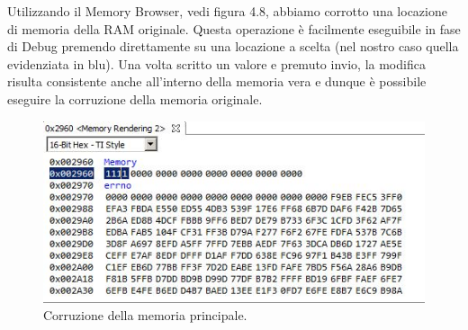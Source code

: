\documentclass[LaM,binding=0.6cm]{../sapthesis}
\begin{document}
Utilizzando il Memory Browser, vedi figura 4.8, abbiamo corrotto una locazione di memoria della RAM originale. Questa operazione è facilmente eseguibile in fase di Debug premendo direttamente su una locazione a scelta (nel nostro caso quella evidenziata in blu). Una volta scritto un valore e premuto invio, la modifica risulta consistente anche all'interno della memoria vera e dunque è possibile eseguire la corruzione della memoria originale.

\begin{figure}[htbp]
\centerline{\includegraphics[scale=0.8]{examples/3_MemoryBrowserCorruzione.JPG}}
\caption{Corruzione della memoria principale.}
\label{fig}
\end{figure}
\vspace{0.5cm}
\end{document}
